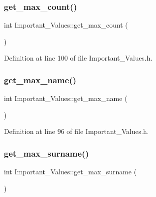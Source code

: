 \mbox{\label{class_important___values_a6971c4d26c6793fbc97302c88fa49862}} 
\subsubsection{\texorpdfstring{get\_max\_count()}{get\_max\_count()}}
{\footnotesize\ttfamily int Important\+\_\+\+Values\+::get\+\_\+max\+\_\+count (\begin{DoxyParamCaption}{ }\end{DoxyParamCaption})\hspace{0.3cm}{\ttfamily [inline]}}



Definition at line 100 of file Important\+\_\+\+Values.\+h.

\mbox{\label{class_important___values_aabf8da45218a436741da31d0efb2f081}} 
\subsubsection{\texorpdfstring{get\_max\_name()}{get\_max\_name()}}
{\footnotesize\ttfamily int Important\+\_\+\+Values\+::get\+\_\+max\+\_\+name (\begin{DoxyParamCaption}{ }\end{DoxyParamCaption})\hspace{0.3cm}{\ttfamily [inline]}}



Definition at line 96 of file Important\+\_\+\+Values.\+h.

\mbox{\label{class_important___values_a9c159ef58aa600bf7adf23f079792285}} 
\subsubsection{\texorpdfstring{get\_max\_surname()}{get\_max\_surname()}}
{\footnotesize\ttfamily int Important\+\_\+\+Values\+::get\+\_\+max\+\_\+surname (\begin{DoxyParamCaption}{ }\end{DoxyParamCaption})\hspace{0.3cm}{\ttfamily [inline]}}



